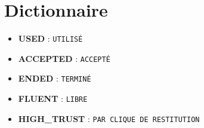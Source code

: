 \documentclass{article}
\begin{document}
\section*{Dictionnaire}
\begin{itemize}[leftmargin=1.2em]
    \item \textbf{USED} : \texttt{UTILISÉ}
    \item \textbf{ACCEPTED} : \texttt{ACCEPTÉ}
    \item \textbf{ENDED} : \texttt{TERMINÉ}
    \item \textbf{FLUENT} : \texttt{LIBRE}
    \item \textbf{HIGH\_TRUST} : \texttt{PAR CLIQUE DE RESTITUTION}
\end{itemize}
\end{document}
